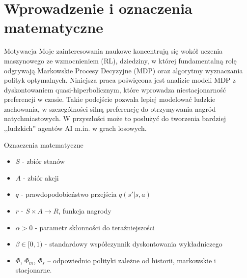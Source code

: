 \section{Wprowadzenie i oznaczenia matematyczne}

\begin{frame}{Motywacja}
   Moje zainteresowania naukowe koncentrują się wokół uczenia maszynowego ze wzmocnieniem (RL), dziedziny, w której fundamentalną rolę odgrywają Markowskie Procesy Decyzyjne (MDP) oraz algorytmy wyznaczania polityk optymalnych. Niniejsza praca poświęcona jest analizie modeli MDP z dyskontowaniem quasi-hiperbolicznym, które wprowadza niestacjonarność preferencji w czasie. Takie podejście pozwala lepiej modelować ludzkie zachowania, w szczególności silną preferencję do otrzymywania nagród natychmiastowych. W przyszłości może to posłużyć do tworzenia bardziej ,,ludzkich'' agentów AI m.in. w grach losowych.
\end{frame}

\begin{frame}{Oznaczenia matematyczne}
  \begin{itemize}
    \item $S$ - zbiór stanów
  \item $A$ - zbiór akcji
  \item $q$ - prawdopodobieństwo przejścia $q(s'|s,a)$
  \item $r$ - $S \times A \rightarrow R$, funkcja nagrody
  \item $\alpha > 0$ - parametr skłonności do teraźniejszości
  \item $\beta \in [0,1)$ - standardowy współczynnik dyskontowania wykładniczego
  \item $\Phi$, $\Phi_m$, $\Phi_s$ -- odpowiednio polityki zależne od historii, markowskie i stacjonarne.
  \end{itemize}
\end{frame}

